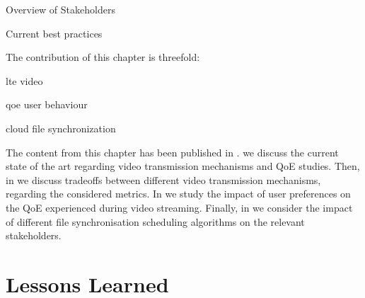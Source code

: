 Overview of Stakeholders

Current best practices

The contribution of this chapter is threefold:
\begin{enumerate*}
\item lte video
\item qoe user behaviour
\item cloud file synchronization
\end{enumerate*}

The content from this chapter has been published in \cite{Schwartz2013b, Hossfeld2015, Schwartz2014a}.
 we discuss the current state of the art regarding video transmission mechanisms and \gls{QoE} studies.
Then, in  we discuss tradeoffs between different video transmission mechanisms, regarding the considered metrics.
In  we study the impact of user preferences on the \gls{QoE} experienced during video streaming.
Finally, in  we consider the impact of different file synchronisation scheduling algorithms on the relevant stakeholders.






\section{Lessons Learned}
